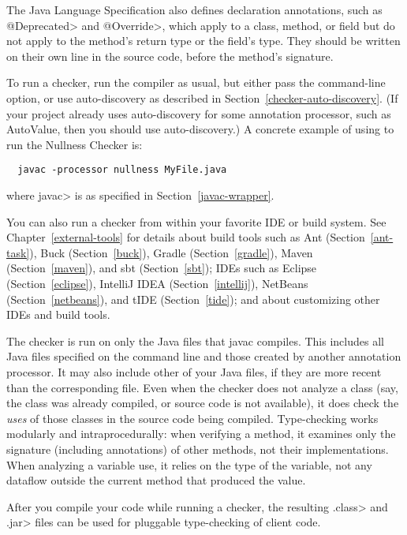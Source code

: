 The Java Language Specification also defines
declaration annotations, such as \<@Deprecated> and \<@Override>, which apply
to a class, method, or field but do not apply to the method's return type
or the field's type.  They should be written on their own line in the
source code, before the method's signature.



To run a checker, run the compiler  as usual,
but either pass the  command-line
option, or use auto-discovery as described in
Section~\ref{checker-auto-discovery}.
(If your project already uses auto-discovery for some annotation processor,
such as AutoValue, then you should use auto-discovery.)
A concrete example of using  to run the Nullness Checker is:

\begin{Verbatim}
  javac -processor nullness MyFile.java
\end{Verbatim}

\noindent
where \<javac> is as specified in Section~\ref{javac-wrapper}.

You can also run a checker from within your favorite IDE or build system.  See
Chapter~\ref{external-tools} for details about build tools such as
Ant (Section~\ref{ant-task}),
Buck (Section~\ref{buck}),
Gradle (Section~\ref{gradle}),
Maven (Section~\ref{maven}), and
sbt (Section~\ref{sbt});
IDEs such as
Eclipse (Section~\ref{eclipse}),
IntelliJ IDEA (Section~\ref{intellij}),
NetBeans (Section~\ref{netbeans}),
and
tIDE (Section~\ref{tide});
and about customizing other IDEs and build tools.

The checker is run on only the Java files that javac compiles.
This includes all Java files specified on the command line and those
created by another annotation processor.  It may also include other of
your Java files, if they are more recent than the corresponding  file.
Even when the checker does not analyze a class (say, the class was
already compiled, or source code is not available), it does check
the \emph{uses} of those classes in the source code being compiled.
Type-checking works modularly and intraprocedurally:  when verifying a
method, it examines only the signature (including annotations) of other
methods, not their implementations.  When analyzing a variable use, it
relies on the type of the variable, not any dataflow outside the current
method that produced the value.

After you compile your code while running a checker, the resulting
\<.class> and \<.jar> files can be used for pluggable type-checking of client code.

